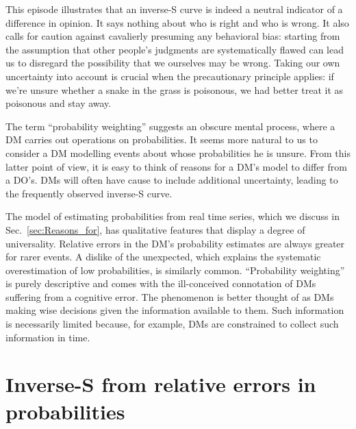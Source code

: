\documentclass[a4paper, 12pt]{article}
\newcommand{\seclabel}[1]{\label{sec:#1}}
\newcommand{\secref}[1]{Sec.~\ref{sec:#1}}
\begin{document}
This episode illustrates that an inverse-S curve is indeed a neutral indicator of a difference in opinion. 
It says nothing about who is right and who is wrong. 
It also calls for caution against cavalierly presuming any behavioral bias: starting from the assumption that other people's judgments are systematically flawed can lead us to disregard the possibility that we ourselves may be wrong. Taking our own uncertainty into account is crucial when the precautionary principle applies: if we're unsure whether a snake in the grass is poisonous, we had better treat it as poisonous and stay away.

The term ``probability weighting'' suggests an obscure mental process, where a DM carries out operations on probabilities. It seems more natural to us to consider a DM modelling events about whose probabilities he is unsure. From this latter point of view, it is easy to think of reasons for a DM's model to differ from a DO's. DMs will often have cause to include additional uncertainty, leading to the frequently observed inverse-S curve.

The model of estimating probabilities from real time series, which we discuss in \secref{Reasons_for}, has qualitative features that display a degree of universality. Relative errors in the DM's probability estimates are always greater for rarer events. A dislike of the unexpected, which explains the systematic overestimation of low probabilities, is similarly common. ``Probability weighting'' is purely descriptive and comes with the ill-conceived connotation of DMs suffering from a cognitive error. The phenomenon is better thought of as DMs making wise decisions given the information available to them. Such information is necessarily limited because, for example, DMs are constrained to collect such information in time.

\newpage
\printbibliography

\appendix

\newpage
\section{Inverse-S from relative errors in probabilities}
\seclabel{relative_errors}
\end{document}
